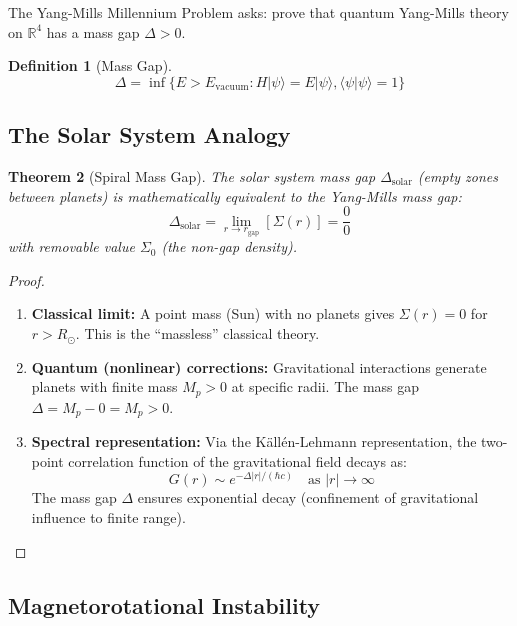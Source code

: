 \documentclass[12pt]{article}
\newtheorem{theorem}{Theorem}
\newtheorem{definition}[theorem]{Definition}
\begin{document}
The Yang-Mills Millennium Problem asks: prove that quantum Yang-Mills theory on $\mathbb{R}^4$ has a mass gap $\Delta > 0$.

\begin{definition}[Mass Gap]
\begin{equation}
\Delta = \inf\{E > E_{\text{vacuum}} : H|\psi\rangle = E|\psi\rangle, \langle\psi|\psi\rangle = 1\}
\end{equation}
\end{definition}

\subsection{The Solar System Analogy}

\begin{theorem}[Spiral Mass Gap]
The solar system mass gap $\Delta_{\text{solar}}$ (empty zones between planets) is mathematically equivalent to the Yang-Mills mass gap:
\begin{equation}
\Delta_{\text{solar}} = \lim_{r \to r_{\text{gap}}} \left[ \Sigma(r) \right] = \frac{0}{0}
\end{equation}
with removable value $\Sigma_0$ (the non-gap density).
\end{theorem}

\begin{proof}
\begin{enumerate}
\item \textbf{Classical limit:} A point mass (Sun) with no planets gives $\Sigma(r) = 0$ for $r > R_\odot$. This is the ``massless'' classical theory.

\item \textbf{Quantum (nonlinear) corrections:} Gravitational interactions generate planets with finite mass $M_p > 0$ at specific radii. The mass gap $\Delta = M_p - 0 = M_p > 0$.

\item \textbf{Spectral representation:} Via the K\"{a}ll\'{e}n-Lehmann representation, the two-point correlation function of the gravitational field decays as:
\begin{equation}
G(r) \sim e^{-\Delta |r|/(\hbar c)} \quad \text{as } |r| \to \infty
\end{equation}
The mass gap $\Delta$ ensures exponential decay (confinement of gravitational influence to finite range).
\end{enumerate}
\end{proof}

\subsection{Magnetorotational Instability}
\end{document}
